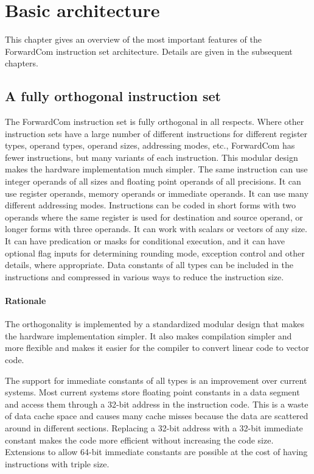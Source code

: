 \documentclass[forwardcom.tex]{subfiles}
\begin{document}
\RaggedRight

\chapter{Basic architecture}

This chapter gives an overview of the most important features of the ForwardCom instruction set architecture. Details are given in the subsequent chapters.

\section{A fully orthogonal instruction set}
The ForwardCom instruction set is fully orthogonal in all respects. 
Where other instruction sets have a large number of different instructions for different register types, operand types, operand sizes, addressing modes, etc., ForwardCom has fewer instructions, but many variants of each instruction. This modular design makes the hardware implementation much simpler.
The same instruction can use integer operands of all sizes and floating point operands of all precisions. It can use register operands, memory operands or immediate operands. It can use many different addressing modes. Instructions can be coded in short forms with two operands where the same register is used for destination and source operand, or longer forms with three operands. It can work with scalars or vectors of any size. It can have predication or masks for conditional execution, and it can have optional flag inputs for determining rounding mode, exception control and other details, where appropriate. Data constants of all types can be included in the instructions and compressed in various ways to reduce the instruction size.

\subsubsection{Rationale}
The orthogonality is implemented by a standardized modular design that makes the hardware implementation simpler. It also makes compilation simpler and more flexible and makes it easier for the compiler to convert linear code to vector code.
\vv

The support for immediate constants of all types is an improvement over current systems. Most current systems store floating point constants in a data segment and access them through a 32-bit address in the instruction code. This is a waste of data cache space and causes many cache misses because the data are scattered around in different sections. Replacing a 32-bit address with a 32-bit immediate constant makes the code more efficient without increasing the code size. Extensions to allow 64-bit immediate constants are possible at the cost of having instructions with triple size.
\end{document}
